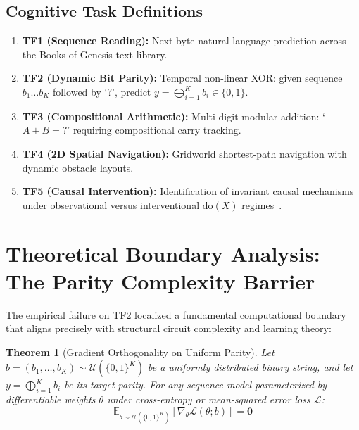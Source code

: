\documentclass[10pt,journal,compsoc]{IEEEtran}
\newtheorem{theorem}{Theorem}
\begin{document}
\subsection{Cognitive Task Definitions}
\begin{enumerate}
    \item \textbf{TF1 (Sequence Reading):} Next-byte natural language prediction across the Books of Genesis text library.
    \item \textbf{TF2 (Dynamic Bit Parity):} Temporal non-linear XOR: given sequence $b_1 \dots b_K$ followed by `$?$', predict $y = \bigoplus_{i=1}^K b_i \in \{0, 1\}$.
    \item \textbf{TF3 (Compositional Arithmetic):} Multi-digit modular addition: `$A + B = ?$' requiring compositional carry tracking.
    \item \textbf{TF4 (2D Spatial Navigation):} Gridworld shortest-path navigation with dynamic obstacle layouts.
    \item \textbf{TF5 (Causal Intervention):} Identification of invariant causal mechanisms under observational versus interventional $\text{do}(X)$ regimes~\cite{pearl2009causality}.
\end{enumerate}

\section{Theoretical Boundary Analysis: The Parity Complexity Barrier}
\label{sec:theory}

The empirical failure on TF2 localized a fundamental computational boundary that aligns precisely with structural circuit complexity and learning theory:

\begin{theorem}[Gradient Orthogonality on Uniform Parity]
\label{thm:ortho}
Let $b = (b_1, \dots, b_K) \sim \mathcal{U}(\{0, 1\}^K)$ be a uniformly distributed binary string, and let $y = \bigoplus_{i=1}^K b_i$ be its target parity. For any sequence model parameterized by differentiable weights $\theta$ under cross-entropy or mean-squared error loss $\mathcal{L}$:
\begin{equation}
\mathbb{E}_{b \sim \mathcal{U}(\{0, 1\}^K)} \left[ \nabla_\theta \mathcal{L}(\theta; b) \right] = \mathbf{0}
\end{equation}
\end{theorem}
\end{document}
